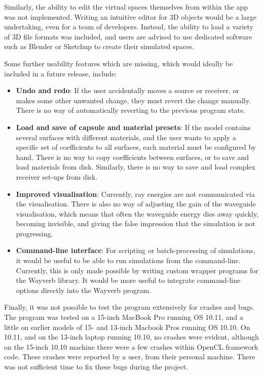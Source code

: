 \documentclass[]{scrreprt}
\providecommand{\tightlist}{%
  \setlength{\itemsep}{0pt}\setlength{\parskip}{0pt}}
\begin{document}
Similarly, the ability to edit the virtual spaces themselves from within
the app was not implemented. Writing an intuitive editor for 3D objects
would be a large undertaking, even for a team of developers. Instead,
the ability to load a variety of 3D file formats was included, and users
are advised to use dedicated software such as Blender or Sketchup to
create their simulated spaces.

Some further usability features which are missing, which would ideally
be included in a future release, include:

\begin{itemize}
\tightlist
\item
  \textbf{Undo and redo}: If the user accidentally moves a source or
  receiver, or makes some other unwanted change, they must revert the
  change manually. There is no way of automatically reverting to the
  previous program state.
\item
  \textbf{Load and save of capsule and material presets}: If the model
  contains several surfaces with different materials, and the user wants
  to apply a specific set of coefficients to all surfaces, each material
  must be configured by hand. There is no way to copy coefficients
  between surfaces, or to save and load materials from disk. Similarly,
  there is no way to save and load complex receiver set-ups from disk.
\item
  \textbf{Improved visualisation}: Currently, ray energies are not
  communicated via the visualisation. There is also no way of adjusting
  the gain of the waveguide visualisation, which means that often the
  waveguide energy dies away quickly, becoming invisible, and giving the
  false impression that the simulation is not progressing.
\item
  \textbf{Command-line interface}: For scripting or batch-processing of
  simulations, it would be useful to be able to run simulations from the
  command-line. Currently, this is only made possible by writing custom
  wrapper programs for the Wayverb library. It would be more useful to
  integrate command-line options directly into the Wayverb program.
\end{itemize}

Finally, it was not possible to test the program extensively for crashes
and bugs. The program was tested on a 15-inch MacBook Pro running OS
10.11, and a little on earlier models of 15- and 13-inch Macbook Pros
running OS 10.10. On 10.11, and on the 13-inch laptop running 10.10, no
crashes were evident, although on the 15-inch 10.10 machine there were a
few crashes within OpenCL framework code. These crashes were reported by
a user, from their personal machine. There was not sufficient time to
fix these bugs during the project.
\end{document}
